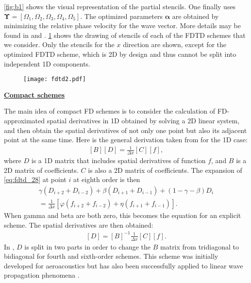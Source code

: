             \ref{fig:b1} shows the visual representation of the partial stencils. One finally uses $\bm{\Upsilon}=[\Omega_1,\Omega_2,\Omega_3,\Omega_4,\Omega_5]$.
            The optimized parameters $\bm{\alpha}$ are obtained by minimizing the relative phase velocity for the wave vector.
            More details may be found in \cite{Walstijn2008Onthenumerical} and \cite{Bilbao2013Constructionandoptimization}.
            \ref{fig:b2} shows the drawing of stencils of each of the FDTD schemes that we consider. Only the stencils for the $x$ direction are shown, except for the optimized FDTD scheme, which is 2D by design
and thus cannot be split into independent 1D components.
            \begin{figure}[htbp]
                    \centerline{\texttt{[image: fdtd2.pdf]}}
                \label{fig:b2}
             \end{figure}

\noindent
        \underline{\textbf{Compact schemes}}

             The main idea of compact FD schemes is to consider the calculation of FD-approximated spatial derivatives in 1D obtained by solving a 2D linear system, and then
obtain the spatial derivatives of not only one point but also its adjacent point at the same time. Here is the general derivation taken from \cite{Hixon2000Prefactoredsmallstencil} for the 1D case:
            \begin{align} \label{eq:fdtd_28}
                [B]\left[D\right]=\frac{1}{\Delta x}[C][f],
            \end{align}
            where $D$ is a 1D matrix that includes spatial derivatives of function $f$, and $B$ is a 2D matrix of coefficients. $C$ is also a 2D matrix of
coefficients. The expansion of \ref{eq:fdtd_28} at point $i$ at eighth order is then
            \begin{align} \label{eq:fdtd_29}
                \gamma(D_{i+2}+D_{i-2})+\beta(D_{i+1}+D_{i-1})+(1-\gamma-\beta)D_i\\
                = \frac{1}{\Delta x}\left[ \varphi(f_{i+2}+f_{i-2})+\eta(f_{i+1}+f_{i-1}) \right].
            \end{align}
            When gamma and beta are both zero, this becomes the equation for an explicit scheme. The spatial derivatives are then obtained:
            \begin{align} \label{eq:fdtd_30}
                [D]=[B]^{-1}\frac{1}{\Delta x}[C][f].
            \end{align}
            In \cite{Hixon2000Prefactoredsmallstencil}, $D$ is split in two parts in order to change the $B$ matrix from tridiagonal to bidiagonal for
fourth and sixth-order schemes. This scheme was initially developed for aeroacoustics but has also been successfully applied to linear wave propagation phenomena
\parencite{Rona2017Optimisedprefactoredcompact}.

